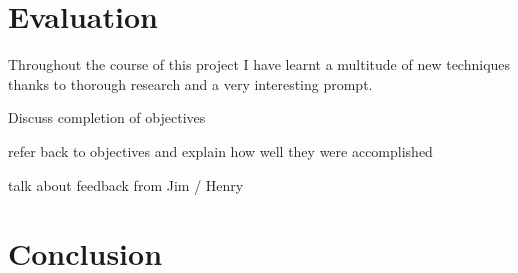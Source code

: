 \documentclass[11pt,a4paper,titlepage]{report}
\begin{document}

















\chapter{Evaluation}








    
    Throughout the course of this project I have learnt a multitude of new techniques thanks to thorough research and a very interesting prompt.

    Discuss completion of objectives

	refer back to objectives and explain how well they were accomplished
	
	talk about feedback from Jim / Henry












\chapter{Conclusion}



	\newpage

	\printbibliography{}
\end{document}
